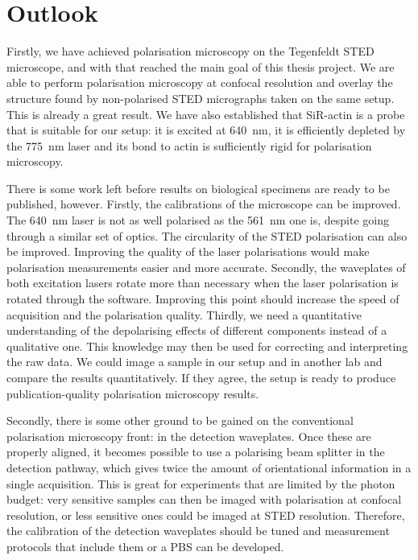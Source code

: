 
\chapter{Outlook}

Firstly, we have achieved polarisation microscopy on the Tegenfeldt STED microscope, and with that reached the main goal of this thesis project. We are able to perform polarisation microscopy at confocal resolution and overlay the structure found by non-polarised STED micrographs taken on the same setup. This is already a great result. We have also established that SiR-actin is a probe that is suitable for our setup: it is excited at 640~nm, it is efficiently depleted by the 775~nm laser and its bond to actin is sufficiently rigid for polarisation microscopy.

There is some work left before results on biological specimens are ready to be published, however. Firstly, the calibrations of the microscope can be improved. The 640~nm laser is not as well polarised as the 561~nm one is, despite going through a similar set of optics. The circularity of the STED polarisation can also be improved. Improving the quality of the laser polarisations would make polarisation measurements easier and more accurate. Secondly, the waveplates of both excitation lasers rotate more than necessary when the laser polarisation is rotated through the software. Improving this point should increase the speed of acquisition and the polarisation quality. Thirdly, we need a quantitative understanding of the depolarising effects of different components instead of a qualitative one. This knowledge may then be used for correcting and interpreting the raw data. We could image a sample in our setup and in another lab and compare the results quantitatively. If they agree, the setup is ready to produce publication-quality polarisation microscopy results.

Secondly, there is some other ground to be gained on the conventional polarisation microscopy front: in the detection waveplates. Once these are properly aligned, it becomes possible to use a polarising beam splitter in the detection pathway, which gives twice the amount of orientational information in a single acquisition. This is great for experiments that are limited by the photon budget: very sensitive samples can then be imaged with polarisation at confocal resolution, or less sensitive ones could be imaged at STED resolution. Therefore, the calibration of the detection waveplates should be tuned and measurement protocols that include them or a PBS can be developed.

